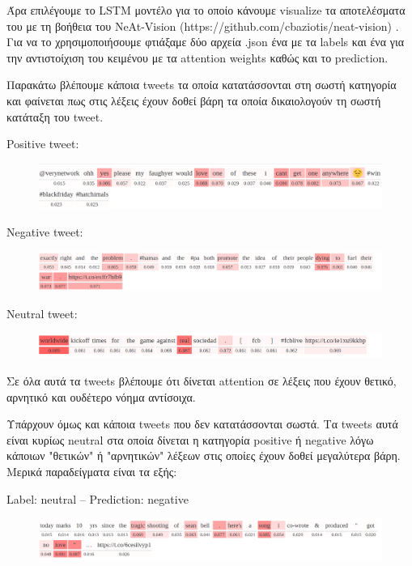 \documentclass[12pt]{article}
\begin{document}
Άρα επιλέγουμε το LSTM μοντέλο για το οποίο κάνουμε visualize τα αποτελέσματα του με τη βοήθεια του NeAt-Vision (https://github.com/cbaziotis/neat-vision) . Για να το χρησιμοποιήσουμε φτιάξαμε δύο αρχεία .json ένα με τα labels και ένα για την αντιστοίχιση του κειμένου με τα attention weights καθώς και το prediction.  

Παρακάτω βλέπουμε κάποια tweets τα οποία κατατάσσονται στη σωστή κατηγορία και φαίνεται πως στις λέξεις έχουν δοθεί βάρη τα οποία δικαιολογούν τη σωστή κατάταξη του tweet.

Positive tweet:
\begin{figure}[h]
	\centering
		\includegraphics[width=0.9\linewidth]{480}
	\label{fig:sin}
\end{figure}

Negative tweet:
\begin{figure}[h]
	\centering
		\includegraphics[width=0.9\linewidth]{321}
	\label{fig:sin}
\end{figure}

Neutral tweet:

\begin{figure}[h]
	\centering
		\includegraphics[width=0.9\linewidth]{162}
	\label{fig:sin}
\end{figure}

Σε όλα αυτά τα tweets βλέπουμε ότι δίνεται attention σε λέξεις που έχουν θετικό, αρνητικό και ουδέτερο νόημα αντίσοιχα. 

Υπάρχουν όμως και κάποια tweets που δεν κατατάσσονται σωστά. Τα tweets αυτά είναι κυρίως neutral στα οποία δίνεται η κατηγορία positive ή negative λόγω κάποιων "θετικών" ή "αρνητικών" λέξεων στις οποίες έχουν δοθεί μεγαλύτερα βάρη. Μερικά παραδείγματα είναι τα εξής:

Label: neutral -- Prediction: negative

\begin{figure}[h]
	\centering
		\includegraphics[width=0.9\linewidth]{100}
	\label{fig:sin}
\end{figure}
\end{document}

